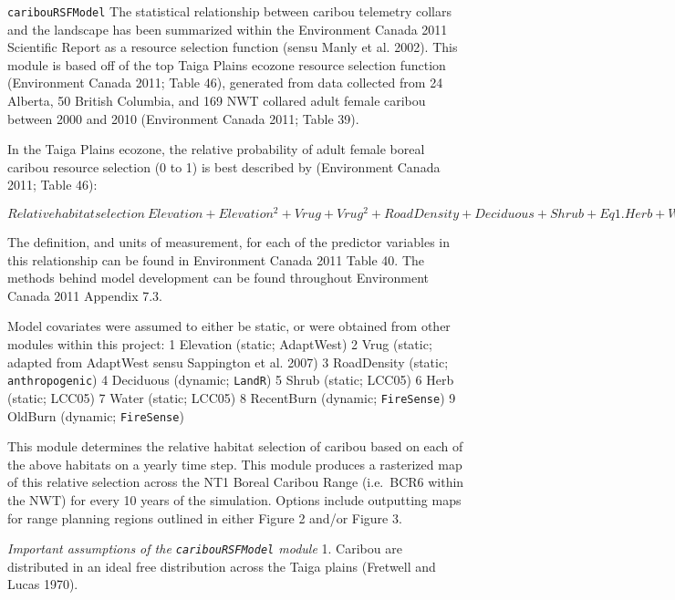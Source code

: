 \documentclass[]{article}
\begin{document}
\texttt{caribouRSFModel} The statistical relationship between caribou
telemetry collars and the landscape has been summarized within the
Environment Canada 2011 Scientific Report as a resource selection
function (sensu Manly et al. 2002). This module is based off of the top
Taiga Plains ecozone resource selection function (Environment Canada
2011; Table 46), generated from data collected from 24 Alberta, 50
British Columbia, and 169 NWT collared adult female caribou between 2000
and 2010 (Environment Canada 2011; Table 39).

In the Taiga Plains ecozone, the relative probability of adult female
boreal caribou resource selection (0 to 1) is best described by
(Environment Canada 2011; Table 46):

\(Relative habitat selection ~ Elevation + Elevation^2 + Vrug + Vrug^2 + RoadDensity + Deciduous + Shrub + Eq 1.  Herb + Water + RecentBurn + OldBurn\)

The definition, and units of measurement, for each of the predictor
variables in this relationship can be found in Environment Canada 2011
Table 40. The methods behind model development can be found throughout
Environment Canada 2011 Appendix 7.3.

Model covariates were assumed to either be static, or were obtained from
other modules within this project: 1 Elevation (static; AdaptWest) 2
Vrug (static; adapted from AdaptWest sensu Sappington et al. 2007) 3
RoadDensity (static; \texttt{anthropogenic}) 4 Deciduous (dynamic;
\texttt{LandR}) 5 Shrub (static; LCC05) 6 Herb (static; LCC05) 7 Water
(static; LCC05) 8 RecentBurn (dynamic; \texttt{FireSense}) 9 OldBurn
(dynamic; \texttt{FireSense})

This module determines the relative habitat selection of caribou based
on each of the above habitats on a yearly time step. This module
produces a rasterized map of this relative selection across the NT1
Boreal Caribou Range (i.e.~BCR6 within the NWT) for every 10 years of
the simulation. Options include outputting maps for range planning
regions outlined in either Figure 2 and/or Figure 3.

\emph{Important assumptions of the \texttt{caribouRSFModel} module} 1.
Caribou are distributed in an ideal free distribution across the Taiga
plains (Fretwell and Lucas 1970).
\end{document}

